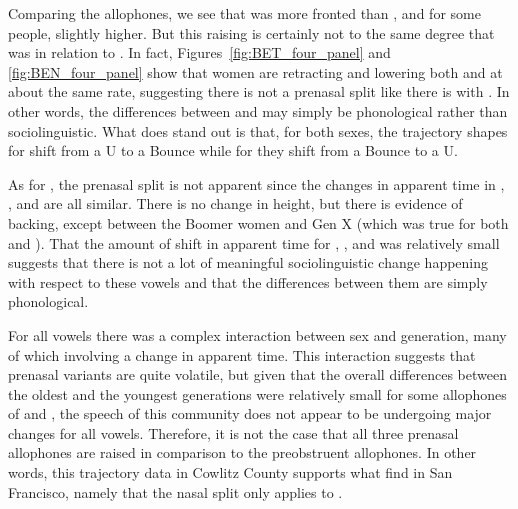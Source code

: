 Comparing the \dress allophones, we see that \ben was more fronted than \bet, and for some people, slightly higher. But this raising is certainly not to the same degree that \ban was in relation to \bat. In fact, Figures~\ref{fig:BET_four_panel} and \ref{fig:BEN_four_panel} show that women are retracting and lowering both \bet and \ben at about the same rate, suggesting there is not a prenasal split like there is with \trap. In other words, the differences between \ben and \bet may simply be phonological rather than sociolinguistic. What does stand out is that, for both sexes, the trajectory shapes for \bet shift from a U to a Bounce while for \ben they shift from a Bounce to a U.

As for \kit, the prenasal split is not apparent since the changes in apparent time in \bit, \bin, and \bing are all similar. There is no change in height, but there is evidence of backing, except between the Boomer women and Gen X (which was true for both \bit and \bin). That the amount of shift in apparent time for \bit, \bin, and \bing was relatively small suggests that there is not a lot of meaningful sociolinguistic change happening with respect to these vowels and that the differences between them are simply phonological.

For all vowels there was a complex interaction between sex and generation, many of which involving a change in apparent time. This interaction suggests that prenasal variants are quite volatile, but given that the overall differences between the oldest and the youngest generations were relatively small for some allophones of \dress and \kit, the speech of this community does not appear to be undergoing major changes for all vowels. Therefore, it is not the case that all three prenasal allophones are raised in comparison to the preobstruent allophones. In other words, this trajectory data in Cowlitz County supports what \citep{cardoso_etal_2016_pads} find in San Francisco, namely that the nasal split only applies to \trap.


